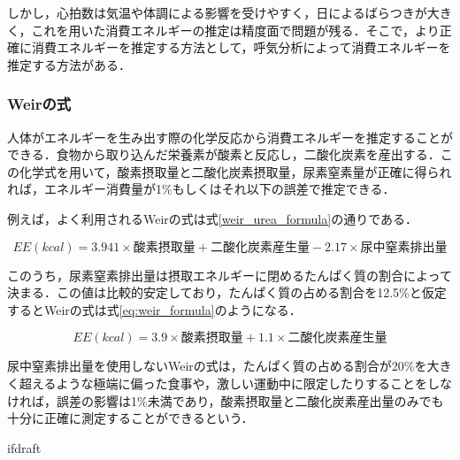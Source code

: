 しかし，心拍数は気温や体調による影響を受けやすく，日によるばらつきが大きく，これを用いた消費エネルギーの推定は精度面で問題が残る．そこで，より正確に消費エネルギーを推定する方法として，呼気分析によって消費エネルギーを推定する方法がある．

\subsubsection{Weirの式}

人体がエネルギーを生み出す際の化学反応から消費エネルギーを推定することができる．食物から取り込んだ栄養素が酸素と反応し，二酸化炭素を産出する．この化学式を用いて，酸素摂取量と二酸化炭素摂取量，尿素窒素量が正確に得られれば，エネルギー消費量が1\%もしくはそれ以下の誤差で推定できる\cite{livesey_1988}．

例えば，よく利用されるWeir\cite{weir_1949}の式は式\ref{weir_urea_formula}の通りである．

\begin{equation}
  \label{weir_urea_formula}
  EE(kcal) = 3.941 \times 酸素摂取量 + 二酸化炭素産生量 - 2.17 \times 尿中窒素排出量
\end{equation}

このうち，尿素窒素排出量は摂取エネルギーに閉めるたんぱく質の割合によって決まる．この値は比較的安定しており，たんぱく質の占める割合を12.5\%と仮定するとWeirの式は式\ref{eq:weir_formula}のようになる．

\begin{equation}
  \label{eq:weir_formula}
  EE(kcal) = 3.9 \times 酸素摂取量 + 1.1 \times 二酸化炭素産生量
\end{equation}

尿中窒素排出量を使用しないWeirの式は，たんぱく質の占める割合が20\%を大きく超えるような極端に偏った食事や，激しい運動中に限定したりすることをしなければ，誤差の影響は1\%未満であり，酸素摂取量と二酸化炭素産出量のみでも十分に正確に測定することができるという\cite{tanaka_2006}．

\expandafter\ifx\csname ifdraft\endcsname\relax
  
\fi

